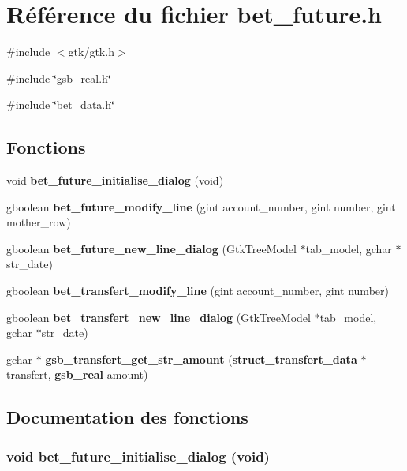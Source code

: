 \section{Référence du fichier bet\_\-future.h}
\label{bet__future_8h}
{\ttfamily \#include $<$gtk/gtk.h$>$}\par
{\ttfamily \#include \char`\"{}gsb\_\-real.h\char`\"{}}\par
{\ttfamily \#include \char`\"{}bet\_\-data.h\char`\"{}}\par
\subsection*{Fonctions}
\begin{DoxyCompactItemize}
\item 
void {\bf bet\_\-future\_\-initialise\_\-dialog} (void)
\item 
gboolean {\bf bet\_\-future\_\-modify\_\-line} (gint account\_\-number, gint number, gint mother\_\-row)
\item 
gboolean {\bf bet\_\-future\_\-new\_\-line\_\-dialog} (GtkTreeModel $\ast$tab\_\-model, gchar $\ast$str\_\-date)
\item 
gboolean {\bf bet\_\-transfert\_\-modify\_\-line} (gint account\_\-number, gint number)
\item 
gboolean {\bf bet\_\-transfert\_\-new\_\-line\_\-dialog} (GtkTreeModel $\ast$tab\_\-model, gchar $\ast$str\_\-date)
\item 
gchar $\ast$ {\bf gsb\_\-transfert\_\-get\_\-str\_\-amount} ({\bf struct\_\-transfert\_\-data} $\ast$transfert, {\bf gsb\_\-real} amount)
\end{DoxyCompactItemize}


\subsection{Documentation des fonctions}
\subsubsection[{bet\_\-future\_\-initialise\_\-dialog}]{\setlength{\rightskip}{0pt plus 5cm}void bet\_\-future\_\-initialise\_\-dialog (void)}\label{bet__future_8h_ab9f4286a82ff1209786e6f1720a9990c}


